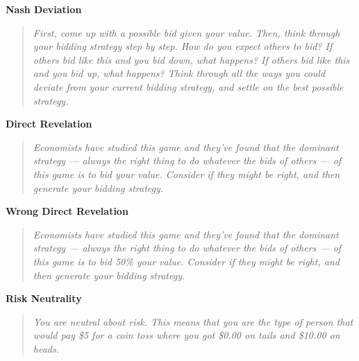 \documentclass{article} %
\begin{document}
\textbf{Nash Deviation}
\begin{quote}
\textit{First, come up with a possible bid given your value. Then, think through your bidding strategy step by step. How do you expect others to bid? If others bid like this and you bid down, what happens? If others bid like this and you bid up, what happens?
Think through all the ways you could deviate from your current bidding strategy, and settle on the best possible strategy. }
\end{quote}


\textbf{Direct Revelation}
\begin{quote}
\textit{
Economists have studied this game and they've found that the dominant strategy — always the right thing to do whatever the bids of others — of this game is to bid your value. Consider if they might be right, and then generate your bidding strategy.
}
\end{quote}

\textbf{Wrong Direct Revelation}
\begin{quote}
\textit{
Economists have studied this game and they've found that the dominant strategy — always the right thing to do whatever the bids of others — of this game is to bid 50\% your value. Consider if they might be right, and then generate your bidding strategy.
}
\end{quote}

\textbf{Risk Neutrality}
\begin{quote}
\textit{
You are neutral about risk. This means that you are the type of person that would pay \$5 for a coin toss where you got \$0.00 on tails and \$10.00 on heads. 
}
\end{quote}



\end{document}
